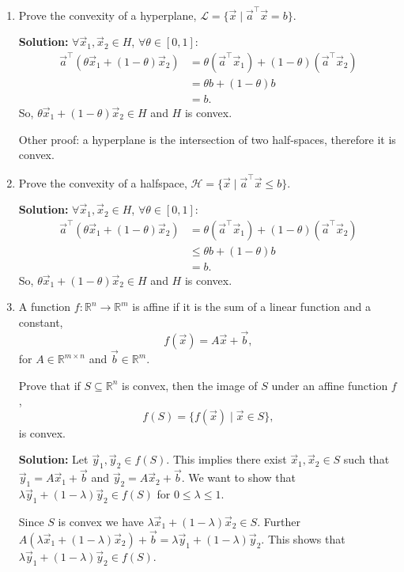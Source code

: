 \documentclass[10pt]{article}
\theoremstyle{definition}
\theoremstyle{plain}
\newcommand{\RR}{\mathbb{R}}
\begin{document}
\begin{enumerate}[label=(\alph*), resume]
    \item Prove the convexity of a hyperplane, $\mathcal{L} = \{\vec{x} \mid \vec{a}^\top \vec{x} = b\}$.

    \textbf{Solution:} $\forall \vec{x}_1, \vec{x}_2 \in H$, $\forall \theta \in [0,1]$:
    \begin{align}
        \vec{a}^\top(\theta \vec{x}_1 + (1-\theta)\vec{x}_2) &= \theta(\vec{a}^\top \vec{x}_1) + (1-\theta)(\vec{a}^\top \vec{x}_2) \\
        &= \theta b + (1-\theta)b \\
        &= b.
    \end{align}
    So, $\theta \vec{x}_1 + (1-\theta)\vec{x}_2 \in H$ and $H$ is convex.

    Other proof: a hyperplane is the intersection of two half-spaces, therefore it is convex.

    \item Prove the convexity of a halfspace, $\mathcal{H} = \{\vec{x} \mid \vec{a}^\top \vec{x} \le b\}$.

    \textbf{Solution:} $\forall \vec{x}_1, \vec{x}_2 \in H$, $\forall \theta \in [0,1]$:
    \begin{align}
        \vec{a}^\top(\theta \vec{x}_1 + (1-\theta)\vec{x}_2) &= \theta(\vec{a}^\top \vec{x}_1) + (1-\theta)(\vec{a}^\top \vec{x}_2) \\
        &\le \theta b + (1-\theta)b \\
        &= b.
    \end{align}
    So, $\theta \vec{x}_1 + (1-\theta)\vec{x}_2 \in H$ and $H$ is convex.

    \item A function $f : \RR^n \to \RR^m$ is affine if it is the sum of a linear function and a constant,
    \begin{equation}
        f(\vec{x}) = A\vec{x} + \vec{b},
    \end{equation}
    for $A \in \RR^{m \times n}$ and $\vec{b} \in \RR^m$.

    Prove that if $S \subseteq \RR^n$ is convex, then the image of $S$ under an affine function $f$,
    \begin{equation}
        f(S) = \{f(\vec{x}) \mid \vec{x} \in S\},
    \end{equation}
    is convex.

    \textbf{Solution:} Let $\vec{y}_1, \vec{y}_2 \in f(S)$. This implies there exist $\vec{x}_1, \vec{x}_2 \in S$ such that $\vec{y}_1 = A\vec{x}_1 + \vec{b}$ and $\vec{y}_2 = A\vec{x}_2 + \vec{b}$. We want to show that $\lambda \vec{y}_1 + (1-\lambda)\vec{y}_2 \in f(S)$ for $0 \le \lambda \le 1$.

    Since $S$ is convex we have $\lambda \vec{x}_1 + (1-\lambda)\vec{x}_2 \in S$. Further $A(\lambda \vec{x}_1 + (1-\lambda)\vec{x}_2) + \vec{b} = \lambda \vec{y}_1 + (1-\lambda)\vec{y}_2$. This shows that $\lambda \vec{y}_1 + (1-\lambda)\vec{y}_2 \in f(S)$.
\end{enumerate}
\end{document}
